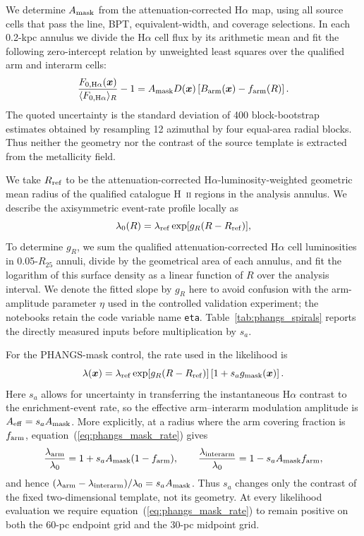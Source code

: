 \documentclass[fleqn,usenatbib]{mnras}
\newcommand{\bs}[1]{\boldsymbol{#1}}
\begin{document}
We determine $A_{\rm mask}$ from the attenuation-corrected H$\alpha$ map, using all source cells that pass the line, BPT, equivalent-width, and coverage selections.  In each 0.2-kpc annulus we divide the H$\alpha$ cell flux by its arithmetic mean and fit the following zero-intercept relation by unweighted least squares over the qualified arm and interarm cells:
\begin{equation}
    \frac{F_{0,{\rm H}\alpha}(\bs{x})}
    {\langle F_{0,{\rm H}\alpha}\rangle_R}-1
    =A_{\rm mask}D(\bs{x})
    \left[B_{\rm arm}(\bs{x})-f_{\rm arm}(R)\right].
    \label{eq:phangs_mask_contrast}
\end{equation}
The quoted uncertainty is the standard deviation of 400 block-bootstrap estimates obtained by resampling 12 azimuthal by four equal-area radial blocks.  Thus neither the geometry nor the contrast of the source template is extracted from the metallicity field.

We take $R_{\rm ref}$ to be the attenuation-corrected H$\alpha$-luminosity-weighted geometric mean radius of the qualified catalogue H~\textsc{ii} regions in the analysis annulus.  We describe the axisymmetric event-rate profile locally as
\begin{equation}
    \lambda_0(R)=\lambda_{\rm ref}
    \exp[g_R(R-R_{\rm ref})],
    \label{eq:phangs_radial_rate}
\end{equation}
To determine $g_R$, we sum the qualified attenuation-corrected H$\alpha$ cell luminosities in 0.05-$R_{25}$ annuli, divide by the geometrical area of each annulus, and fit the logarithm of this surface density as a linear function of $R$ over the analysis interval.  We denote the fitted slope by $g_R$ here to avoid confusion with the arm-amplitude parameter $\eta$ used in the controlled validation experiment; the notebooks retain the code variable name \texttt{eta}.  Table~\ref{tab:phangs_spirals} reports the directly measured inputs before multiplication by $s_a$.

For the PHANGS-mask control, the rate used in the likelihood is
\begin{equation}
    \lambda(\bs{x})=
    \lambda_{\rm ref}\exp[g_R(R-R_{\rm ref})]
    \left[1+s_a g_{\rm mask}(\bs{x})\right].
    \label{eq:phangs_mask_rate}
\end{equation}
Here $s_a$ allows for uncertainty in transferring the instantaneous H$\alpha$ contrast to the enrichment-event rate, so the effective arm--interarm modulation amplitude is $A_{\rm eff}=s_aA_{\rm mask}$.  More explicitly, at a radius where the arm covering fraction is $f_{\rm arm}$, equation~(\ref{eq:phangs_mask_rate}) gives
\begin{equation}
    \frac{\lambda_{\rm arm}}{\lambda_0}
    =1+s_aA_{\rm mask}(1-f_{\rm arm}),
    \qquad
    \frac{\lambda_{\rm interarm}}{\lambda_0}
    =1-s_aA_{\rm mask}f_{\rm arm},
    \label{eq:phangs_effective_arm_amplitude}
\end{equation}
and hence $(\lambda_{\rm arm}-\lambda_{\rm interarm})/\lambda_0=s_aA_{\rm mask}$.  Thus $s_a$ changes only the contrast of the fixed two-dimensional template, not its geometry.  At every likelihood evaluation we require equation~(\ref{eq:phangs_mask_rate}) to remain positive on both the 60-pc endpoint grid and the 30-pc midpoint grid.
\end{document}

